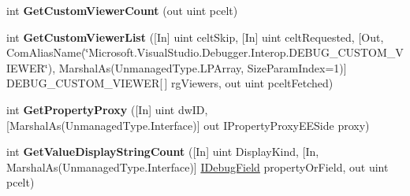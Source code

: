 \begin{DoxyCompactItemize}
\item 
\hypertarget{interface_microsoft_1_1_visual_studio_1_1_debugger_1_1_interop_e_e_1_1_i_e_e_visualizer_service_a3af5b45f0b5d6a9514fd2cbe7181832a}{int {\bfseries Get\+Custom\+Viewer\+Count} (out uint pcelt)}\label{interface_microsoft_1_1_visual_studio_1_1_debugger_1_1_interop_e_e_1_1_i_e_e_visualizer_service_a3af5b45f0b5d6a9514fd2cbe7181832a}

\item 
\hypertarget{interface_microsoft_1_1_visual_studio_1_1_debugger_1_1_interop_e_e_1_1_i_e_e_visualizer_service_a0f64a3577f0e18259acfe9cd56b4f40e}{int {\bfseries Get\+Custom\+Viewer\+List} (\mbox{[}In\mbox{]} uint celt\+Skip, \mbox{[}In\mbox{]} uint celt\+Requested, \mbox{[}Out, Com\+Alias\+Name(\char`\"{}Microsoft.\+Visual\+Studio.\+Debugger.\+Interop.\+D\+E\+B\+U\+G\+\_\+\+C\+U\+S\+T\+O\+M\+\_\+\+V\+I\+E\+W\+E\+R\char`\"{}), Marshal\+As(Unmanaged\+Type.\+L\+P\+Array, Size\+Param\+Index=1)\mbox{]} D\+E\+B\+U\+G\+\_\+\+C\+U\+S\+T\+O\+M\+\_\+\+V\+I\+E\+W\+E\+R\mbox{[}$\,$\mbox{]} rg\+Viewers, out uint pcelt\+Fetched)}\label{interface_microsoft_1_1_visual_studio_1_1_debugger_1_1_interop_e_e_1_1_i_e_e_visualizer_service_a0f64a3577f0e18259acfe9cd56b4f40e}

\item 
\hypertarget{interface_microsoft_1_1_visual_studio_1_1_debugger_1_1_interop_e_e_1_1_i_e_e_visualizer_service_a06193730d9b7237f7f91d062a14126d5}{int {\bfseries Get\+Property\+Proxy} (\mbox{[}In\mbox{]} uint dw\+I\+D, \mbox{[}Marshal\+As(Unmanaged\+Type.\+Interface)\mbox{]} out I\+Property\+Proxy\+E\+E\+Side proxy)}\label{interface_microsoft_1_1_visual_studio_1_1_debugger_1_1_interop_e_e_1_1_i_e_e_visualizer_service_a06193730d9b7237f7f91d062a14126d5}

\item 
\hypertarget{interface_microsoft_1_1_visual_studio_1_1_debugger_1_1_interop_e_e_1_1_i_e_e_visualizer_service_a45a95ba5bf5088d6a49f6fdf6334da05}{int {\bfseries Get\+Value\+Display\+String\+Count} (\mbox{[}In\mbox{]} uint Display\+Kind, \mbox{[}In, Marshal\+As(Unmanaged\+Type.\+Interface)\mbox{]} \hyperlink{interface_microsoft_1_1_visual_studio_1_1_debugger_1_1_interop_e_e_1_1_i_debug_field}{I\+Debug\+Field} property\+Or\+Field, out uint pcelt)}\label{interface_microsoft_1_1_visual_studio_1_1_debugger_1_1_interop_e_e_1_1_i_e_e_visualizer_service_a45a95ba5bf5088d6a49f6fdf6334da05}


\end{DoxyCompactItemize}
